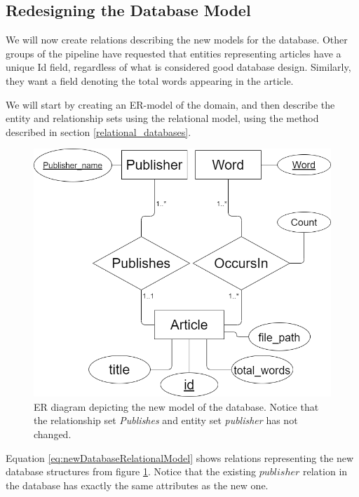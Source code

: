 \subsection{Redesigning the Database Model}\label{databaseModelRedesignNF}
We will now create relations describing the new models for the database.
Other groups of the \knox{} pipeline have requested that entities representing articles have a unique Id field, regardless of what is considered good database design.
Similarly, they want a field denoting the total words appearing in the article.

We will start by creating an ER-model of the domain, and then describe the entity and relationship sets using the relational model, using the method described in section \ref{relational_databases}.

\begin{figure}[H]
    \centering
    \includegraphics[scale=0.35]{Images/new ER.drawio.png}
    \caption{ER diagram depicting the new model of the database. Notice that the relationship set \textit{Publishes} and entity set \textit{publisher} has not changed.}
    \label{fig:newdatabaseRedesignER}
\end{figure}

Equation \ref{eq:newDatabaseRelationalModel} shows relations representing the new database structures from figure \ref{fig:newdatabaseRedesignER}.
Notice that the existing $publisher$ relation in the database has exactly the same attributes as the new one. 

